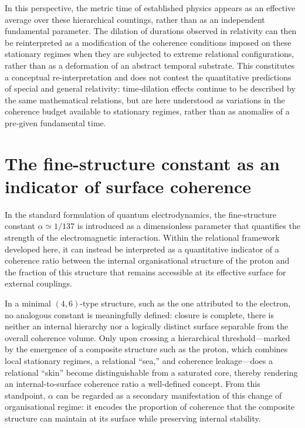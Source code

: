 \documentclass[11pt,a4paper]{article}
\begin{document}
In this perspective, the metric time of established physics appears as an effective average over these hierarchical countings, rather than as an independent fundamental parameter. The dilation of durations observed in relativity can then be reinterpreted as a modification of the coherence conditions imposed on these stationary regimes when they are subjected to extreme relational configurations, rather than as a deformation of an abstract temporal substrate. This constitutes a conceptual re‑interpretation and does not contest the quantitative predictions of special and general relativity: time‑dilation effects continue to be described by the same mathematical relations, but are here understood as variations in the coherence budget available to stationary regimes, rather than as anomalies of a pre‑given fundamental time.

\section{The fine-structure constant as an indicator of surface coherence}

In the standard formulation of quantum electrodynamics, the fine-structure constant \(\alpha \simeq 1/137\) is introduced as a dimensionless parameter that quantifies the strength of the electromagnetic interaction. Within the relational framework developed here, it can instead be interpreted as a quantitative indicator of a coherence ratio between the internal organisational structure of the proton and the fraction of this structure that remains accessible at its effective surface for external couplings.

In a minimal \((4,6)\)-type structure, such as the one attributed to the electron, no analogous constant is meaningfully defined: closure is complete, there is neither an internal hierarchy nor a logically distinct surface separable from the overall coherence volume. Only upon crossing a hierarchical threshold—marked by the emergence of a composite structure such as the proton, which combines local stationary regimes, a relational “sea,” and coherence leakage—does a relational “skin” become distinguishable from a saturated core, thereby rendering an internal-to-surface coherence ratio a well-defined concept. From this standpoint, \(\alpha\) can be regarded as a secondary manifestation of this change of organisational regime: it encodes the proportion of coherence that the composite structure can maintain at its surface while preserving internal stability.
\end{document}
